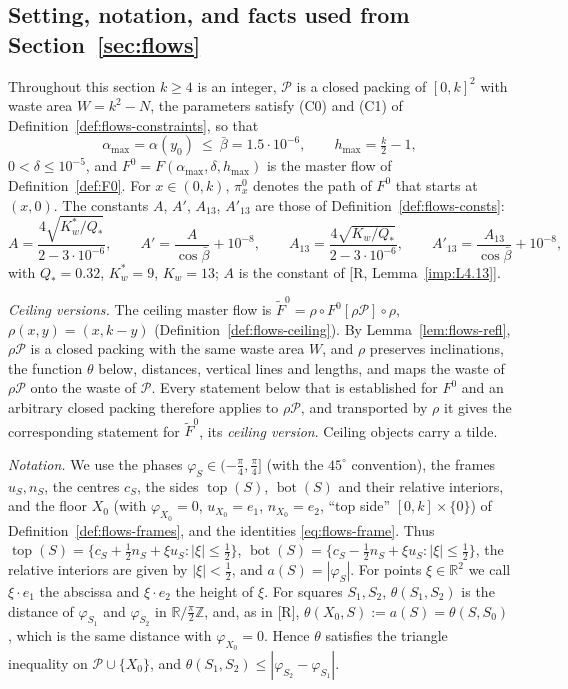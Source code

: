 \documentclass[11pt]{amsart}
\newcommand{\R}{\mathbb R}
\newcommand{\Z}{\mathbb Z}
\newcommand{\cP}{\mathcal P}
\newcommand{\Bot}{\operatorname{bot}}
\newcommand{\Top}{\operatorname{top}}
\newcommand{\amax}{\alpha_{\max}}
\newcommand{\hmax}{h_{\max}}
\newcommand{\bbar}{\bar\beta}
\newcommand{\Fz}{F^{0}}
\theoremstyle{definition}
\theoremstyle{remark}
\numberwithin{equation}{section}
\begin{document}
\subsection{Setting, notation, and facts used from Section~\ref{sec:flows}}\label{ssec:P6-setting}

Throughout this section $k\ge4$ is an integer, $\cP$ is a closed packing of $[0,k]^2$ with waste area $W=k^2-N$, the
parameters satisfy \textup{(C0)} and \textup{(C1)} of Definition~\ref{def:flows-constraints}, so that
\begin{equation}\label{eq:P6-params}
\amax=\alpha(y_0)\ \le\ \bbar=1.5\cdot10^{-6},\qquad \hmax=\tfrac k2-1,
\end{equation}
$0<\delta\le10^{-5}$, and $\Fz=F(\amax,\delta,\hmax)$ is the master flow of Definition~\ref{def:F0}. For $x\in(0,k)$,
$\pi^0_x$ denotes the path of $\Fz$ that starts at $(x,0)$. The constants $A$, $A'$, $A_{13}$, $A'_{13}$ are those of
Definition~\ref{def:flows-consts}:
\[
A=\frac{4\sqrt{K_w^*/Q_*}}{2-3\cdot10^{-6}},\qquad A'=\frac{A}{\cos\bbar}+10^{-8},\qquad
A_{13}=\frac{4\sqrt{K_w/Q_*}}{2-3\cdot10^{-6}},\qquad A'_{13}=\frac{A_{13}}{\cos\bbar}+10^{-8},
\]
with $Q_*=0.32$, $K_w^*=9$, $K_w=13$; $A$ is the constant of [R, Lemma~\ref{imp:L4.13}].

\emph{Ceiling versions.} The ceiling master flow is $\tilde F^0=\rho\circ\Fz[\rho\cP]\circ\rho$, $\rho(x,y)=(x,k-y)$
(Definition~\ref{def:flows-ceiling}). By Lemma~\ref{lem:flows-refl}, $\rho\cP$ is a closed packing with the same
waste area $W$, and $\rho$ preserves inclinations, the function $\theta$ below, distances, vertical lines and lengths,
and maps the waste of $\rho\cP$ onto the waste of $\cP$. Every statement below that is established for $\Fz$ and an
arbitrary closed packing therefore applies to $\rho\cP$, and transported by $\rho$ it gives the corresponding
statement for $\tilde F^0$, its \emph{ceiling version}. Ceiling objects carry a tilde.

\emph{Notation.} We use the phases $\varphi_S\in(-\frac\pi4,\frac\pi4]$ (with the $45^\circ$ convention), the
frames $u_S,n_S$, the centres $c_S$, the sides $\Top(S)$, $\Bot(S)$ and their relative interiors, and the floor
$X_0$ (with $\varphi_{X_0}=0$, $u_{X_0}=e_1$, $n_{X_0}=e_2$, ``top side'' $[0,k]\times\{0\}$) of
Definition~\ref{def:flows-frames}, and the identities \eqref{eq:flows-frame}. Thus
$\Top(S)=\{c_S+\frac12n_S+\xi u_S:|\xi|\le\frac12\}$, $\Bot(S)=\{c_S-\frac12n_S+\xi u_S:|\xi|\le\frac12\}$, the
relative interiors are given by $|\xi|<\frac12$, and $a(S)=|\varphi_S|$. For points $\xi\in\R^2$ we call
$\xi\cdot e_1$ the abscissa and $\xi\cdot e_2$ the height of $\xi$. For squares $S_1,S_2$, $\theta(S_1,S_2)$ is the
distance of $\varphi_{S_1}$ and $\varphi_{S_2}$ in $\R/\frac\pi2\Z$, and, as in [R], $\theta(X_0,S):=a(S)=\theta(S,S_0)$,
which is the same distance with $\varphi_{X_0}=0$. Hence $\theta$ satisfies the triangle inequality on
$\cP\cup\{X_0\}$, and $\theta(S_1,S_2)\le|\varphi_{S_2}-\varphi_{S_1}|$.
\end{document}
